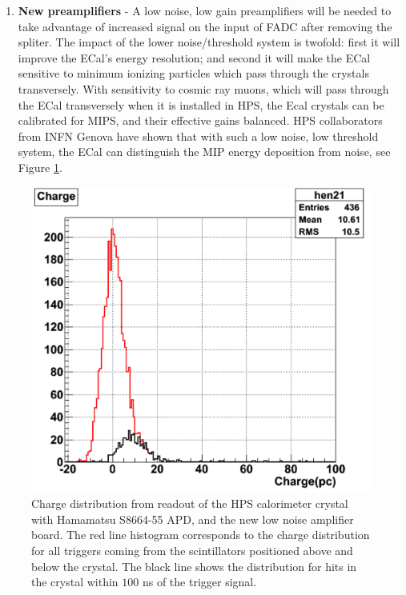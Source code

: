 \begin{enumerate}
 
\item {\bf New preamplifiers} - A low noise, low gain preamplifiers will be needed to take advantage of increased signal on the input of FADC after removing the spliter. The impact of the lower noise/threshold system is twofold: first it 
will improve the ECal's energy resolution; and second it will make the ECal sensitive to minimum ionizing particles which pass through the crystals transversely. With sensitivity to cosmic ray muons, which will pass through the ECal transversely when it is installed in HPS, the Ecal crystals can be calibrated for MIPS, and their effective gains balanced.  HPS collaborators from INFN Genova have shown that with such a low noise, low threshold system, the ECal can distinguish the MIP energy deposition from noise, see Figure \ref{fig:mip5x5}.


\end{enumerate}

\begin{figure}[t]
\includegraphics[scale=0.4]{ecal/MIP_5x5_APD.png}
\caption{\small{Charge distribution from readout of the HPS calorimeter crystal with Hamamatsu S8664-55 APD, and the new low noise amplifier board. The red line histogram corresponds to the charge distribution for all triggers coming from the scintillators positioned above and below the crystal. The black line shows the distribution for hits in the crystal 
within $100$ ns of the trigger signal. }}\label{fig:mip5x5}
\end{figure}

